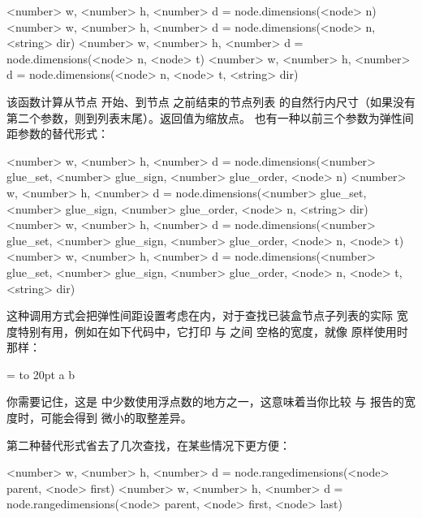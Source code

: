 
\begin{typing}
<number> w, <number> h, <number> d  =
    node.dimensions(<node> n)
<number> w, <number> h, <number> d  =
    node.dimensions(<node> n, <string> dir)
<number> w, <number> h, <number> d  =
    node.dimensions(<node> n, <node> t)
<number> w, <number> h, <number> d  =
    node.dimensions(<node> n, <node> t, <string> dir)
\end{typing}

该函数计算从节点  开始、到节点  之前结束的节点列表
的自然行内尺寸（如果没有第二个参数，则到列表末尾）。返回值为缩放点。
也有一种以前三个参数为弹性间距参数的替代形式：

\begin{typing}
<number> w, <number> h, <number> d  =
    node.dimensions(<number> glue_set, <number> glue_sign, <number> glue_order,
        <node> n)
<number> w, <number> h, <number> d  =
    node.dimensions(<number> glue_set, <number> glue_sign, <number> glue_order,
        <node> n, <string> dir)
<number> w, <number> h, <number> d  =
    node.dimensions(<number> glue_set, <number> glue_sign, <number> glue_order,
        <node> n, <node> t)
<number> w, <number> h, <number> d  =
    node.dimensions(<number> glue_set, <number> glue_sign, <number> glue_order,
        <node> n, <node> t, <string> dir)
\end{typing}

这种调用方式会把弹性间距设置考虑在内，对于查找已装盒节点子列表的实际
宽度特别有用，例如在如下代码中，它打印  与  之间
空格的宽度，就像  原样使用时那样：

\begin{typing}
 = \hbox to 20pt {a b}

\end{typing}

你需要记住，这是 \TEX 中少数使用浮点数的地方之一，这意味着当你比较
 与  报告的宽度时，可能会得到
微小的取整差异。

第二种替代形式省去了几次查找，在某些情况下更方便：

\begin{typing}
<number> w, <number> h, <number> d  =
    node.rangedimensions(<node> parent, <node> first)
<number> w, <number> h, <number> d  =
    node.rangedimensions(<node> parent, <node> first, <node> last)
\end{typing}

